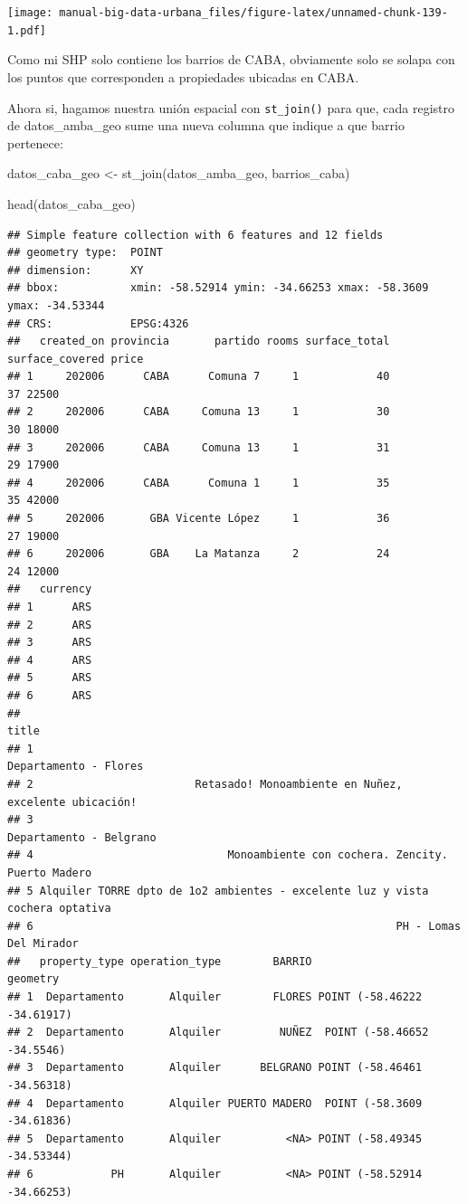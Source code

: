 \documentclass[
  spanish,
]{book}
\newenvironment{Shaded}{\begin{snugshade}}{\end{snugshade}}
\newcommand{\FunctionTok}[1]{\textcolor[rgb]{0.00,0.00,0.00}{#1}}
\newcommand{\NormalTok}[1]{#1}
\newcommand{\OtherTok}[1]{\textcolor[rgb]{0.56,0.35,0.01}{#1}}
\begin{document}
\texttt{[image: manual-big-data-urbana\_files/figure-latex/unnamed-chunk-139-1.pdf]}

Como mi SHP solo contiene los barrios de CABA, obviamente solo se solapa con los puntos que corresponden a propiedades ubicadas en CABA.

Ahora si, hagamos nuestra unión espacial con \texttt{st\_join()} para que, cada registro de datos\_amba\_geo sume una nueva columna que indique a que barrio pertenece:

\begin{Shaded}
\begin{Highlighting}[]
\NormalTok{datos\_caba\_geo }\OtherTok{\textless{}{-}} \FunctionTok{st\_join}\NormalTok{(datos\_amba\_geo, barrios\_caba)}
\end{Highlighting}
\end{Shaded}

\begin{Shaded}
\begin{Highlighting}[]
\FunctionTok{head}\NormalTok{(datos\_caba\_geo)}
\end{Highlighting}
\end{Shaded}

\begin{verbatim}
## Simple feature collection with 6 features and 12 fields
## geometry type:  POINT
## dimension:      XY
## bbox:           xmin: -58.52914 ymin: -34.66253 xmax: -58.3609 ymax: -34.53344
## CRS:            EPSG:4326
##   created_on provincia       partido rooms surface_total surface_covered price
## 1     202006      CABA      Comuna 7     1            40              37 22500
## 2     202006      CABA     Comuna 13     1            30              30 18000
## 3     202006      CABA     Comuna 13     1            31              29 17900
## 4     202006      CABA      Comuna 1     1            35              35 42000
## 5     202006       GBA Vicente López     1            36              27 19000
## 6     202006       GBA    La Matanza     2            24              24 12000
##   currency
## 1      ARS
## 2      ARS
## 3      ARS
## 4      ARS
## 5      ARS
## 6      ARS
##                                                                           title
## 1                                                         Departamento - Flores
## 2                         Retasado! Monoambiente en Nuñez, excelente ubicación!
## 3                                                       Departamento - Belgrano
## 4                              Monoambiente con cochera. Zencity. Puerto Madero
## 5 Alquiler TORRE dpto de 1o2 ambientes - excelente luz y vista cochera optativa
## 6                                                        PH - Lomas Del Mirador
##   property_type operation_type        BARRIO                    geometry
## 1  Departamento       Alquiler        FLORES POINT (-58.46222 -34.61917)
## 2  Departamento       Alquiler         NUÑEZ  POINT (-58.46652 -34.5546)
## 3  Departamento       Alquiler      BELGRANO POINT (-58.46461 -34.56318)
## 4  Departamento       Alquiler PUERTO MADERO  POINT (-58.3609 -34.61836)
## 5  Departamento       Alquiler          <NA> POINT (-58.49345 -34.53344)
## 6            PH       Alquiler          <NA> POINT (-58.52914 -34.66253)
\end{verbatim}
\end{document}
